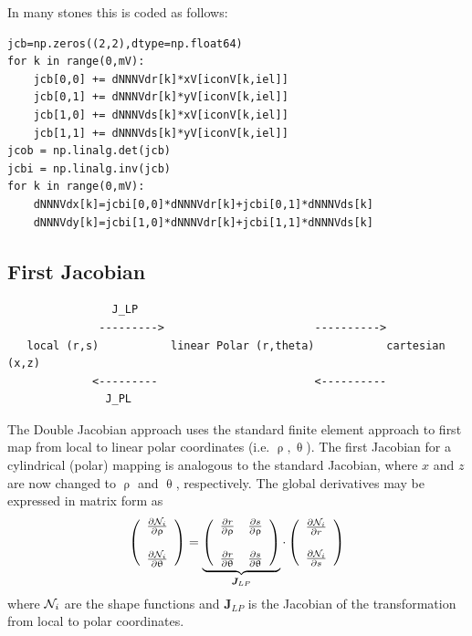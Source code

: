\vspace{.5cm}

In many stones this is coded as follows:
\begin{lstlisting}
jcb=np.zeros((2,2),dtype=np.float64)
for k in range(0,mV):
    jcb[0,0] += dNNNVdr[k]*xV[iconV[k,iel]]
    jcb[0,1] += dNNNVdr[k]*yV[iconV[k,iel]]
    jcb[1,0] += dNNNVds[k]*xV[iconV[k,iel]]
    jcb[1,1] += dNNNVds[k]*yV[iconV[k,iel]]
jcob = np.linalg.det(jcb)
jcbi = np.linalg.inv(jcb)
for k in range(0,mV):
    dNNNVdx[k]=jcbi[0,0]*dNNNVdr[k]+jcbi[0,1]*dNNNVds[k]
    dNNNVdy[k]=jcbi[1,0]*dNNNVdr[k]+jcbi[1,1]*dNNNVds[k]
\end{lstlisting}



\subsection{First Jacobian}


\begin{verbatim}
                J_LP
              --------->                       ---------->
   local (r,s)           linear Polar (r,theta)           cartesian (x,z)
             <---------                        <----------
               J_PL
\end{verbatim}


The Double Jacobian approach uses the standard finite element approach to first map 
from local to linear polar coordinates (i.e. $\uprho,\uptheta$). The first Jacobian for 
a cylindrical (polar) mapping is analogous to the standard Jacobian, where $x$ and $z$ 
are now changed to $\uprho$ and $\uptheta$, respectively.
The global derivatives may be expressed in matrix form as
\begin{equation}
\left(
\begin{array}{c}
\frac{\partial {\mathcal{N}}_i}{\partial \uprho} \\ \\
\frac{\partial {\mathcal{N}}_i}{\partial \uptheta} 
\end{array}
\right)
= 
\underbrace{\left(
\begin{array}{cc}
\frac{\partial r}{\partial \uprho}  & 
\frac{\partial s}{\partial \uprho} \\ \\ 
\frac{\partial r}{\partial \uptheta}  & 
\frac{\partial s}{\partial \uptheta} 
\end{array}
\right)}_{{\bm J}_{LP}}
\cdot
\left(
\begin{array}{c}
\frac{\partial {\mathcal{N}}_i}{\partial r} \\ \\
\frac{\partial {\mathcal{N}}_i}{\partial s} 
\end{array}
\right)
\label{eq:DJ1}
\end{equation}
where ${\mathcal{N}}_i$ are the shape functions and ${\bm J}_{LP}$ 
is the Jacobian of the transformation from local to polar coordinates.

